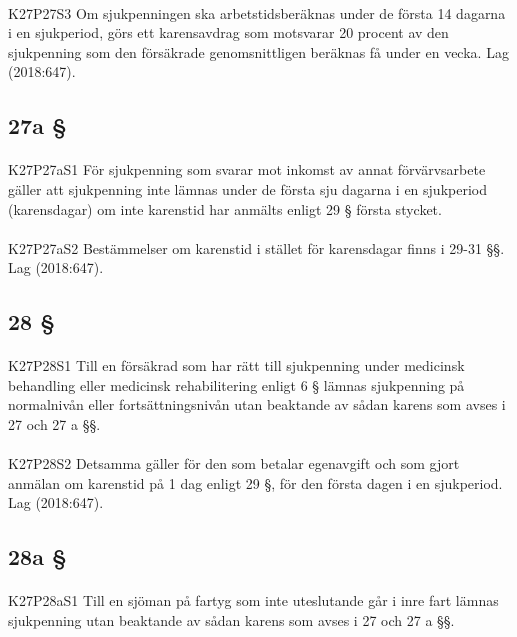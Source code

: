 \documentclass[a4paper,notitlepage,openany,10pt]{book}
\begin{document}
\paragraph*{}
{\tiny K27P27S3}
Om sjukpenningen ska arbetstidsberäknas under de första 14 dagarna i en sjukperiod, görs ett karensavdrag som motsvarar 20 procent av den sjukpenning som den försäkrade genomsnittligen beräknas få under en vecka.
Lag (2018:647).
\subsection*{27a §}
\paragraph*{}
{\tiny K27P27aS1}
För sjukpenning som svarar mot inkomst av annat förvärvsarbete gäller att sjukpenning inte lämnas under de första sju dagarna i en sjukperiod (karensdagar) om inte karenstid har anmälts enligt 29 § första stycket.
\paragraph*{}
{\tiny K27P27aS2}
Bestämmelser om karenstid i stället för karensdagar finns i 29-31 §§.
Lag (2018:647).
\subsection*{28 §}
\paragraph*{}
{\tiny K27P28S1}
Till en försäkrad som har rätt till sjukpenning under medicinsk behandling eller medicinsk rehabilitering enligt 6 § lämnas sjukpenning på normalnivån eller fortsättningsnivån utan beaktande av sådan karens som avses i 27 och 27 a §§.
\paragraph*{}
{\tiny K27P28S2}
Detsamma gäller för den som betalar egenavgift och som gjort anmälan om karenstid på 1 dag enligt 29 §, för den första dagen i en sjukperiod.
Lag (2018:647).
\subsection*{28a §}
\paragraph*{}
{\tiny K27P28aS1}
Till en sjöman på fartyg som inte uteslutande går i inre fart lämnas sjukpenning utan beaktande av sådan karens som avses i 27 och 27 a §§.
\end{document}
